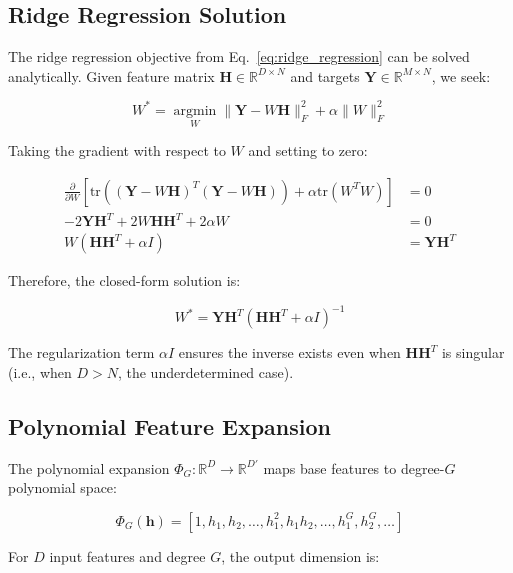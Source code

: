 \documentclass[conference]{IEEEtran}
\begin{document}
\subsection{Ridge Regression Solution}

The ridge regression objective from Eq.~\ref{eq:ridge_regression} can be solved analytically. Given feature matrix $\mathbf{H} \in \mathbb{R}^{D \times N}$ and targets $\mathbf{Y} \in \mathbb{R}^{M \times N}$, we seek:

\begin{equation}
W^* = \operatorname*{argmin}_W \|\mathbf{Y} - W\mathbf{H}\|_F^2 + \alpha \|W\|_F^2
\label{eq:ridge_objective}
\end{equation}

Taking the gradient with respect to $W$ and setting to zero:

\begin{align}
\frac{\partial}{\partial W} \left[\text{tr}((\mathbf{Y} - W\mathbf{H})^T(\mathbf{Y} - W\mathbf{H})) + \alpha \text{tr}(W^T W)\right] &= 0 \\
-2\mathbf{Y}\mathbf{H}^T + 2W\mathbf{H}\mathbf{H}^T + 2\alpha W &= 0 \\
W(\mathbf{H}\mathbf{H}^T + \alpha I) &= \mathbf{Y}\mathbf{H}^T
\end{align}

Therefore, the closed-form solution is:

\begin{equation}
W^* = \mathbf{Y}\mathbf{H}^T(\mathbf{H}\mathbf{H}^T + \alpha I)^{-1}
\label{eq:ridge_solution}
\end{equation}

The regularization term $\alpha I$ ensures the inverse exists even when $\mathbf{H}\mathbf{H}^T$ is singular (i.e., when $D > N$, the underdetermined case).

\subsection{Polynomial Feature Expansion}

The polynomial expansion $\Phi_G: \mathbb{R}^D \rightarrow \mathbb{R}^{D'}$ maps base features to degree-$G$ polynomial space:

\begin{equation}
\Phi_G(\mathbf{h}) = [1, h_1, h_2, \ldots, h_1^2, h_1 h_2, \ldots, h_1^G, h_2^G, \ldots]
\label{eq:poly_expansion_full}
\end{equation}

For $D$ input features and degree $G$, the output dimension is:
\end{document}
